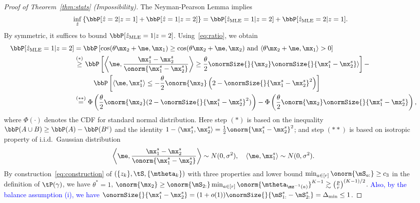 \documentclass[lettersize,onecolumn,journal]{IEEEtran}
\theoremstyle{definition}
\theoremstyle{definition}
\newcommand{\ang}[1]{\left\langle#1\right\rangle}
\begin{document}
\begin{proof}[Proof of Theorem~\ref{thm:stats} (Impossibility)]
The Neyman-Pearson Lemma implies
\begin{align}\label{eq:lower}
&\inf_{\hat z}\left\{\bbP[\hat z=2|z=1] + \bbP[\hat z=1|z=2]\right\}= \bbP[\hat z_{\text{MLE}}=1|z=2]+\bbP[\hat z_{\text{MLE}}=2|z=1].
\end{align}
By symmetric, it suffices to bound $\bbP[\hat z_{\text{MLE}}=1|z=2]$. Using~\eqref{eq:ratio}, we obtain
\begin{align}\label{eq:bound}
\bbP[\hat z_{\text{MLE}}=1|z=2]&= \bbP\left[ \cos(\theta\mx_2+\me,\mx_1)\geq  \cos(\theta\mx_2+\me, \mx_2) \text{ and } \langle \theta\mx_2+\me,\mx_1\rangle > 0  \right] \notag \\
&\stackrel{(*)}{\geq} \bbP \left[\left\langle \me, {\mx^s_1 -\mx^s_2\over\onorm{\mx^s_1- \mx^s_2}}  \right\rangle  \geq {\theta \over 2}\onormSize{}{\mx_2} \onormSize{}{\mx^s_1-\mx^s_2}\rangle\right]-\notag \\
&\hspace{1cm} \bbP\left[\langle \me, \mx^s_1\rangle \leq -{\theta \over 2}\onorm{\mx_2}\left(2-\onormSize{}{\mx^s_1-\mx^s_2}^2\right)\right]\notag \\
&\stackrel{(**)}{=}\Phi\left({\theta \over 2}\onorm{\mx_2}(2-\onormSize{}{\mx^s_1-\mx^s_2}^2) \right)-\Phi\left({\theta\over 2}\onorm{\mx_2}\onormSize{}{\mx^s_1-\mx^s_2} \right),
\end{align}
where $\Phi(\cdot)$ denotes the CDF for standard normal distribution. Here step $(*)$ is based on the inequality $\bbP(A\cup B)\geq \bbP(A)-\bbP(B^c)$ and the identity $1-\langle \mx^s_1,\mx^s_2 \rangle={1\over 2}\onorm{\mx^s_1-\mx^s_2}^2$; and step $(**)$ is based on isotropic property of i.i.d.\ Gaussian distribution
\[
\left\langle\me, {\mx^s_1-\mx^s_2\over \onorm{\mx^s_1-\mx^s_2}} \right\rangle \sim N(0, \sigma^2),\quad \langle \me, \mx^s_1 \rangle \sim N(0,\sigma^2).
\]
By construction~\eqref{eq:construction} of $(\{z_k\}, \tS, \{\mtheta_k\})$ with three properties and lower bound $\min_{a\in[r]}\onorm{\mS_{a:}}\geq c_3$ in the definition of $\tP(\gamma)$, we have $\theta^*=1$, $\onorm{\mx_2}\geq \onorm{\mS_{2:}}\min_{a\in[r]}\onorm{\mtheta_{\mz^{-1}(a)}}^{K-1} \gtrsim \left(p \over r\right)^{(K-1)/2}$.
\textcolor{blue}{Also, by the balance assumption (i), we have $\onormSize{}{\mx^s_1-\mx^s_2} = (1+o(1)) \onormSize{}{\mS_{1:}^s-\mS_{2:}^s} = \Delta_{\min} \leq 1$}.


\end{proof}
\end{document}
